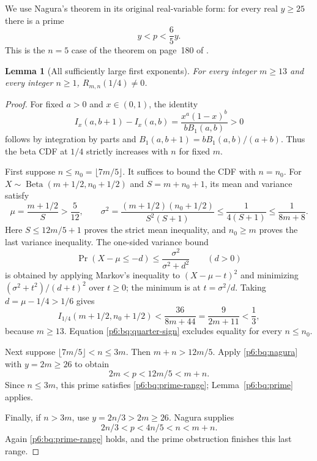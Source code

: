 \documentclass[11pt,a4paper]{article}
\newtheorem{lemma}[theorem]{Lemma}
\theoremstyle{definition}
\theoremstyle{remark}
\numberwithin{equation}{section}
\begin{document}
We use Nagura's theorem in its original real-variable form:
for every real $y\ge25$ there is a prime
\begin{equation}\label{p6:bq:nagura}
 y<p<\frac65y.
\end{equation}
This is the $n=5$ case of the theorem on page~180 of
\cite{p6:bq:Nagura}.

\begin{lemma}[All sufficiently large first exponents]
\label{p6:bq:large}
For every integer $m\ge13$ and every integer $n\ge1$,
$R_{m,n}(1/4)\ne0$.
\end{lemma}

\begin{proof}
For fixed $a>0$ and $x\in(0,1)$, the identity
\begin{equation}\label{p6:bq:monotonicity}
 I_x(a,b+1)-I_x(a,b)
   =\frac{x^a(1-x)^b}{bB_1(a,b)}>0
\end{equation}
follows by integration by parts and
$B_1(a,b+1)=bB_1(a,b)/(a+b)$. Thus the beta CDF at
$1/4$ strictly increases with $n$ for fixed $m$.

First suppose $n\le n_0=\lfloor7m/5\rfloor$.
It suffices to bound the CDF with $n=n_0$.
For $X\sim\operatorname{Beta}(m+1/2,n_0+1/2)$ and
$S=m+n_0+1$, its mean and variance satisfy
\[
 \mu=\frac{m+1/2}{S}>\frac5{12},\qquad
 \sigma^2=\frac{(m+1/2)(n_0+1/2)}{S^2(S+1)}
      \le\frac1{4(S+1)}\le\frac1{8m+8}.
\]
Here $S\le12m/5+1$ proves the strict mean inequality,
and $n_0\ge m$ proves the last variance inequality.
The one-sided variance bound
\[
 \Pr(X-\mu\le-d)\le\frac{\sigma^2}{\sigma^2+d^2}
 \qquad(d>0)
\]
is obtained by applying Markov's inequality to
$(X-\mu-t)^2$ and minimizing $(\sigma^2+t^2)/(d+t)^2$
over $t\ge0$; the minimum is at $t=\sigma^2/d$.
Taking $d=\mu-1/4>1/6$ gives
\begin{equation}\label{p6:bq:cantelli}
 I_{1/4}(m+1/2,n_0+1/2)
   <\frac{36}{8m+44}=\frac9{2m+11}<\frac13,
\end{equation}
because $m\ge13$. Equation \eqref{p6:bq:quarter-sign}
excludes equality for every $n\le n_0$.

Next suppose $\lfloor7m/5\rfloor<n\le3m$.
Then $m+n>12m/5$. Apply \eqref{p6:bq:nagura} with
$y=2m\ge26$ to obtain
\[
 2m<p<12m/5<m+n.
\]
Since $n\le3m$, this prime satisfies
\eqref{p6:bq:prime-range}; Lemma~\ref{p6:bq:prime} applies.

Finally, if $n>3m$, use $y=2n/3>2m\ge26$.
Nagura supplies
\[
 2n/3<p<4n/5<n<m+n.
\]
Again \eqref{p6:bq:prime-range} holds, and the prime obstruction
finishes this last range.
\end{proof}
\end{document}
